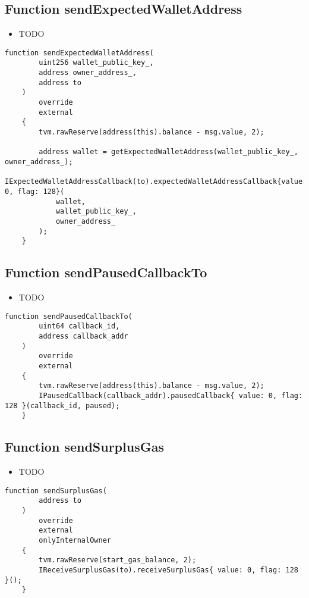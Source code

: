 \subsection{Function sendExpectedWalletAddress}

\noindent\begin{itemize}
\item TODO
\end{itemize}

\begin{lstlisting}[firstnumber=135]
    function sendExpectedWalletAddress(
        uint256 wallet_public_key_,
        address owner_address_,
        address to
    )
        override
        external
    {
        tvm.rawReserve(address(this).balance - msg.value, 2);

        address wallet = getExpectedWalletAddress(wallet_public_key_, owner_address_);
        IExpectedWalletAddressCallback(to).expectedWalletAddressCallback{value: 0, flag: 128}(
            wallet,
            wallet_public_key_,
            owner_address_
        );
    }
\end{lstlisting}

\subsection{Function sendPausedCallbackTo}

\noindent\begin{itemize}
\item TODO
\end{itemize}

\begin{lstlisting}[firstnumber=424]
    function sendPausedCallbackTo(
        uint64 callback_id,
        address callback_addr
    )
        override
        external
    {
        tvm.rawReserve(address(this).balance - msg.value, 2);
        IPausedCallback(callback_addr).pausedCallback{ value: 0, flag: 128 }(callback_id, paused);
    }
\end{lstlisting}

\subsection{Function sendSurplusGas}

\noindent\begin{itemize}
\item TODO
\end{itemize}

\begin{lstlisting}[firstnumber=387]
    function sendSurplusGas(
        address to
    )
        override
        external
        onlyInternalOwner
    {
        tvm.rawReserve(start_gas_balance, 2);
        IReceiveSurplusGas(to).receiveSurplusGas{ value: 0, flag: 128 }();
    }
\end{lstlisting}

